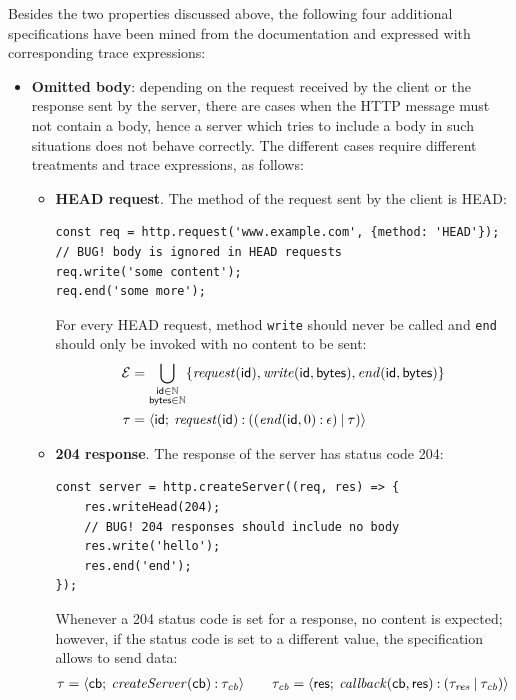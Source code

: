 Besides the two properties discussed above, the following four additional specifications have been mined from
the documentation and expressed with corresponding trace expressions:
\begin{itemize}
	\item \textbf{Omitted body}: depending on the request received by the client or the response sent by the server, there are cases when the HTTP message must not contain a body, hence a server which tries to include a body in such situations does not behave correctly. The different cases require different treatments and trace expressions, as follows:
	\begin{itemize}
	  \item \textbf{HEAD request}. The method of the request sent by the client is HEAD:
		\begin{lstlisting}[belowskip=-3em]
const req = http.request('www.example.com', {method: 'HEAD'});
// BUG! body is ignored in HEAD requests
req.write('some content');
req.end('some more');
		\end{lstlisting}
		For every HEAD request, method \lstinline|write| should never be called and \lstinline|end| should only be invoked with no content to be sent:
		\begin{align*}
			\mathcal{E} &= \bigcup_{\substack{\mathsf{id} \in \mathbb{N} \\ \mathsf{bytes} \in \mathbb{N}}}
			\{ \mathit{request}(\mathsf{id}), \mathit{write}(\mathsf{id}, \mathsf{bytes}), \mathit{end}(\mathsf{id}, \mathsf{bytes}) \} \\
			\tau &= {\langle}\mathsf{\mathsf{id}};\:{\mathit{request}(\mathsf{id}) \mathbin{:} ((\mathit{end}(\mathsf{id}, 0) \mathbin{:} \epsilon) \mathbin{|} \tau)}{\rangle}
		\end{align*}
		\item \textbf{204 response}. The response of the server has status code 204:
		\begin{lstlisting}[belowskip=-3em]
const server = http.createServer((req, res) => {
	res.writeHead(204);
	// BUG! 204 responses should include no body
	res.write('hello');
	res.end('end');
});
		\end{lstlisting}
		Whenever a 204 status code is set for a response, no content is expected; however, if the status code is set to a different value, the specification allows to send data:
		\begin{align*}
			\tau &= \var{\avar{cb}}{\mathit{createServer}(\avar{cb}) \prefixop \tau_{\mathit{cb}}} \qquad
			\tau_{\mathit{cb}} = \var{ \avar{res} }{ \cbt(\avar{cb}, \avar{res}) \prefixop (\tau_{\mathit{res}} \shuffleop \tau_{\mathit{cb}}) }\\

\end{align*}
\end{itemize}
\end{itemize}
